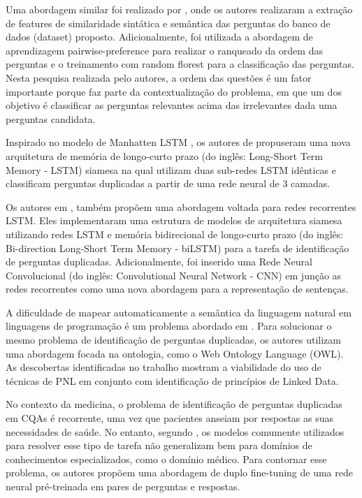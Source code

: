 \documentclass[conference]{IEEEtran}
\begin{document}
Uma abordagem similar foi realizado por \cite{Byron2017}, onde os autores realizaram a extração de features de similaridade sintática e semântica das perguntas do banco de dados (dataset) proposto. Adicionalmente, foi utilizada a abordagem de aprendizagem pairwise-preference para realizar o ranqueado da ordem das perguntas e o treinamento com random florest para a classificação das perguntas. Nesta pesquisa realizada pelo autores, a ordem das questões é um fator importante porque faz parte da contextualização do problema, em que um dos objetivo é classificar as perguntas relevantes acima das irrelevantes dada uma perguntas candidata.

Inspirado no modelo de Manhatten LSTM \cite{Mueller2016}, os autores de \cite{Chen2017-2} propuseram uma nova arquitetura de memória de longo-curto prazo (do inglês: Long-Short Term Memory - LSTM) siamesa na qual utilizam duas sub-redes LSTM idênticas e classificam perguntas duplicadas a partir de uma rede neural de 3 camadas. 

Os autores em \cite{Chali2018}, também propõem uma abordagem voltada para redes recorrentes LSTM. Eles implementaram uma estrutura de modelos de arquitetura siamesa utilizando redes LSTM e memória bidirecional de longo-curto prazo (do inglês: Bi-direction Long-Short Term Memory - biLSTM) para a tarefa de identificação de perguntas duplicadas. Adicionalmente, foi inserido uma Rede Neural Convolucional (do inglês: Convolutional Neural Network - CNN) em junção as redes recorrentes como uma nova abordagem para a representação de sentenças.

A dificuldade de mapear automaticamente a semântica da linguagem natural em linguagens de programação é um problema abordado em \cite{Bhattacharjee2019}. Para solucionar o mesmo problema de identificação de perguntas duplicadas, os autores utilizam uma abordagem focada na ontologia, como o Web Ontology Language (OWL). As descobertas identificadas no trabalho mostram a viabilidade do uso de técnicas de PNL em conjunto com identificação de princípios de Linked Data.

No contexto da medicina, o problema de identificação de perguntas duplicadas em CQAs é recorrente, uma vez que pacientes anseiam por respostas as suas necessidades de saúde. No entanto, segundo \cite{McCreery2020}, os modelos comumente utilizados para resolver esse tipo de tarefa não generalizam bem para domínios de conhecimentos especializados, como o domínio médico. Para contornar esse problema, os autores propõem uma abordagem de duplo fine-tuning de uma rede neural pré-treinada em pares de perguntas e respostas.
\end{document}
